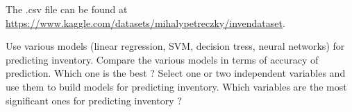 \documentclass{article}
\begin{document}
 The .csv file can be found at \url{https://www.kaggle.com/datasets/mihalypetreczky/invendataset}. 
   
  Use various models (linear regression, SVM, decision tress, neural networks) for predicting inventory. Compare the various models in terms of accuracy of prediction. Which one is the best ? 
   Select one or two independent variables  and use them to build models for predicting inventory.
Which variables are the most significant ones for predicting  inventory  ?  




   
   
\end{document}
